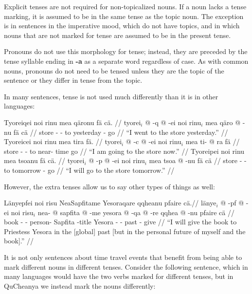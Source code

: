 \documentclass{article}
\begin{document}
Explicit tenses are not required for non-topicalized nouns.  If a noun lacks a tense marking, it is assumed to be in the same tense as the topic noun.  The exception is in sentences in the imperative mood, which do not have topics, and in which nouns that are not marked for tense are assumed to be in the present tense.

Pronouns do not use this morphology for tense; instead, they are preceded by the tense syllable ending in \textbf{-a} as a separate word regardless of case. As with common nouns, pronouns do not need to be tensed unless they are the topic of the sentence or they differ in tense from the topic.

In many sentences, tense is not used much differently than it is in other languages:

\pex[lingstyle=QuCheanya] 
\a
\begingl
\glpreamble Tyoreiqei noi rinu mea q\"aronu f\"a c\"a. //
\gla tyorei$_i$ @ -q @ -ei noi rinu$_i$ mea q\"aro @ -nu f\"a c\"a //
\glb store - -   to yesterday - go  //
\glft ``I went to the store yesterday.'' //
\endgl
\a
\begingl
\glpreamble Tyoreicei noi rinu mea tira f\"a. //
\gla tyorei$_i$ @ -c @ -ei noi rinu$_i$ mea ti- @ ra f\"a //
\glb store - -   to near- time go //
\glft ``I am going to the store now.'' //
\endgl
\a
\begingl
\glpreamble Tyoreipei noi rinu mea tsoanu f\"a c\"a. //
\gla tyorei$_i$ @ -p @ -ei noi rinu$_i$ mea tsoa @ -nu f\"a c\"a //
\glb store - -   to tomorrow - go  //
\glft ``I will go to the store tomorrow.'' //
\endgl
\xe

However, the extra tenses allow us to say other types of things as well:

\ex[lingstyle=QuCheanya] \begingl
\glpreamble L\"anyepfei noi risu NeaSapfitame Yesoraqare qqheanu pfaire c\"a.//
\gla l\"anye$_i$ @ -pf @ -ei noi risu$_i$ nea- @ sapfita @ -me yesora @ -qa @ -re qqhea @ -nu pfaire c\"a //
\glb book - -   person- Sapfita -title Yesora - - past - give  //
\glft ``I will give the book to Priestess Yesora in the [global] past [but in the personal future of myself and the book].'' //
\endgl \xe

It is not only sentences about time travel events that benefit from being able to mark different nouns in different tenses. Consider the following sentence, which in many languages would have the two verbs marked for different tenses, but in QuCheanya we instead mark the nouns differently:
\end{document}
